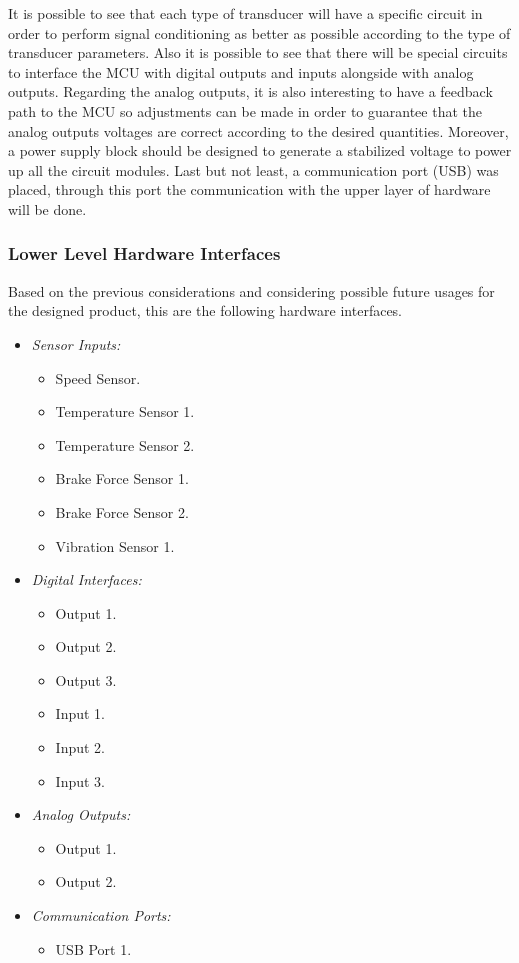 		It is possible to see that each type of transducer will have a specific circuit in order to perform signal conditioning as better as possible according to the type of transducer parameters. Also it is possible to see that there will be special circuits to interface the MCU with digital outputs and inputs alongside with analog outputs. Regarding the analog outputs, it is also interesting to have a feedback path to the MCU so adjustments can be made in order to guarantee that the analog outputs voltages are correct according to the desired quantities. Moreover, a power supply block should be designed to generate a stabilized voltage to power up all the circuit modules. Last but not least, a communication port (USB) was placed, through this port the communication with the upper layer of hardware will be done.

		\subsubsection{Lower Level Hardware Interfaces}\label{sssec:lower-level-hardware-interfaces}

			Based on the previous considerations and considering possible future usages for the designed product, this are the following hardware interfaces.

			\begin{itemize}
				\item \textit{Sensor Inputs:}
					\begin{itemize}
						\item Speed Sensor.
						\item Temperature Sensor 1.
						\item Temperature Sensor 2.
						\item Brake Force Sensor 1.
						\item Brake Force Sensor 2.
						\item Vibration Sensor 1.
					\end{itemize}
				\item \textit{Digital Interfaces:}
					\begin{itemize}
						\item Output 1.
						\item Output 2.
						\item Output 3.
						\item Input 1.
						\item Input 2.
						\item Input 3.
					\end{itemize}
				\item \textit{Analog Outputs:}
					\begin{itemize}
						\item Output 1.
						\item Output 2.
					\end{itemize}
				\item \textit{Communication Ports:}
					\begin{itemize}
						\item USB Port 1.
					\end{itemize}
			\end{itemize}